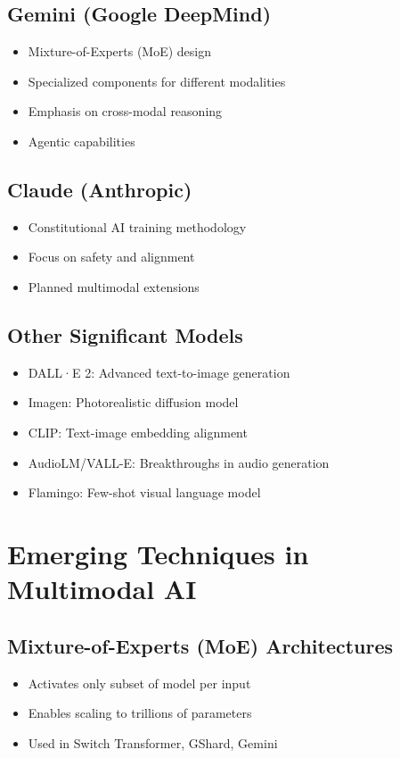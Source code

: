 \documentclass[openany]{book}
\begin{document}
\subsection{Gemini (Google DeepMind)}
\begin{itemize}
    \item Mixture-of-Experts (MoE) design
    \item Specialized components for different modalities
    \item Emphasis on cross-modal reasoning
    \item Agentic capabilities
\end{itemize}

\subsection{Claude (Anthropic)}
\begin{itemize}
    \item Constitutional AI training methodology
    \item Focus on safety and alignment
    \item Planned multimodal extensions
\end{itemize}

\subsection{Other Significant Models}
\begin{itemize}
    \item DALL·E 2: Advanced text-to-image generation
    \item Imagen: Photorealistic diffusion model
    \item CLIP: Text-image embedding alignment
    \item AudioLM/VALL-E: Breakthroughs in audio generation
    \item Flamingo: Few-shot visual language model
\end{itemize}

\section{Emerging Techniques in Multimodal AI}

\subsection{Mixture-of-Experts (MoE) Architectures}
\begin{itemize}
    \item Activates only subset of model per input
    \item Enables scaling to trillions of parameters
    \item Used in Switch Transformer, GShard, Gemini
\end{itemize}
\end{document}
